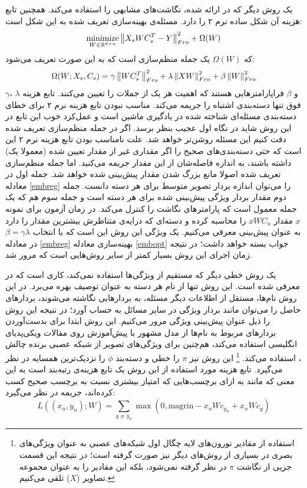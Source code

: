 یک روش دیگر که در \cite{ emb15} ارائه شده، نگاشت‌های مشابهی را استفاده می‌کند. همچنین تابع هزینه آن شکل ساده نرم ۲ را دارد. مسئله‌ی بهینه‌سازی تعریف شده به این شکل است:
\begin{equation} 
\operatorname*{minimize}_{W \in \mathbb{R}^{d \times a}} \left \lVert X_s WC_s^T-Y \right \rVert_{Fro}^2 + \Omega(W) \label{embopt}
\end{equation}
که $\Omega(W)$ یک جمله منظم‌سازی است که به این صورت تعریف می‌شود:
\begin{align}\label{embreg}
 \Omega(W;X_s, C_s) = \gamma \left \lVert WC_s^T \right \rVert_{Fro}^2 + \lambda \left \lVert XW \right \rVert_{Fro}^2 + \beta \left \lVert W \right \rVert_{Fro}^2 
\end{align}
$\gamma $، 
$\lambda$ و 
$\beta$
فراپارامترهایی هستند که اهمیت هر یک از جملات را تعیین می‌کنند. 
 تابع هزینه فوق تنها دسته‌بندی اشتباه را جریمه می‌کند. مناسب نبودن تابع هزینه نرم ۲ برای خطای دسته‌بندی مسئله‌ای شناخته شده در یادگیری ماشین است و عمل‌کرد خوب این تابع در این روش شاید در نگاه اول عجیب بنظر برسد. اگر در جمله منظم‌سازی تعریف شده دقت کنیم این مسئله روشن‌تر خواهد شد. علت نامناسب بودن تابع هزینه نرم ۲ این است که حتی دسته‌بندی‌های صحیح را اگر مقداری غیر از مقدار تعیین شده (معمولا یک) داشته باشند، به اندازه فاصله‌شان از این مقدار جریمه می‌کنید. اما جمله منظم‌سازی تعریف شده اصولا مانع بزرگ شدن مقدار پیش‌بینی شده خواهد شد. جمله اول در معادله \eqref{embreg} را می‌توان اندازه بردار تصویر متوسط برای هر دسته دانست. جمله دوم مقدار بردار ویژگی پیش‌بینی شده برای هر دسته است و جمله سوم هم که یک جمله معمول است که پارامترهای نگاشت را کنترل می‌کند. در زمان آزمون برای نمونه $x$ مقدار $xWC_u$ را محاسبه کرده و دسته‌ای که درایه‌ی متناظرش بیشترین مقدار را دارد به عنوان پیش‌بینی معرفی می‌کنیم. یک ویژگی این روش این است که با انتخاب $ \beta = \gamma \lambda$ در معادله \eqref{embreg} بهینه‌سازی معادله \eqref{embopt} جواب بسته خواهد داشت؛ در نتیجه زمان اجرای این روش بسیار کمتر از سایر روش‌هایی است که مرور شد. 

یک روش خطی دیگر که مستقیم از ویژگی‌ها استفاده نمی‌کند، کاری است که در \cite{ devise} معرفی شده است. این روش تنها از نام هر دسته به عنوان توصیف بهره می‌برد. در این روش نام‌ها، مستقل از اطلاعات دیگر مسئله، به بردارهایی نگاشته می‌شوند، بردارهای حاصل را می‌توان مانند بردار ویژگی در سایر مسائل به حساب آورد؛ در نتیجه این روش را ذیل عنوان پیش‌بینی ویژگی مرور می‌کنیم. این روش ابتدا برای بدست‌آوردن بردارهای مربوط به نام‌ها از مدل مشهور 
  \cite{word2vec} 
با پیش‌آموزش روی مقالات ویکی‌پدیای انگلیسی استفاده می‌کند، هم‌چنین برای ویژگی‌های تصویر از شبکه عصبی برنده چالش
،
استفاده می‌کند. \footnote{ استفاده از مقادیر نورون‌های لایه چگال اول شبکه‌های عصبی به عنوان ویژگی‌های بصری در بسیاری از روش‌های دیگر نیز صورت گرفته است؛ در نتیجه این قسمت جزیی از نگاشت $\pi$ در نظر گرفته نمی‌شود، بلکه این مقادیر را به عنوان مجموعه تصاویر ($X$) تلقی می‌کنیم. }
این روش نیز $\pi$ را خطی و دسته‌بند $\phi$ را نزدیک‌ترین همسایه در نظر می‌گیرد. تابع هزینه مورد استفاده از این روش یک تابع هزینه‌ی رتبه‌بند است به این معنی که مانند  \cite{ akata13} به ازای  برچسب‌هایی که امتیاز بیشتری نسبت به برچسب صحیح کسب کرده‌اند، جریمه در نظر می‌گیرد:
\begin{equation}
 L((x_n, y_n);W) = \sum_{y\neq y_n} \max(0, \text{magrin} - x_nWc_{y_n} + x_nWc_y) 
\end{equation}

